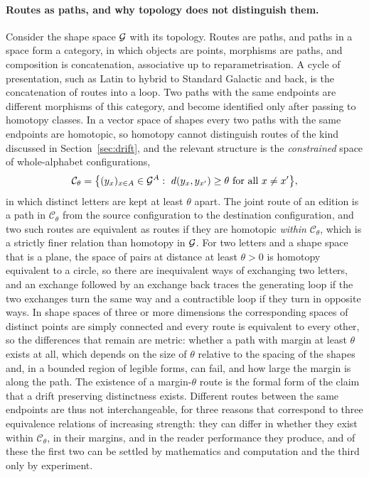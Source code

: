 \paragraph{Routes as paths, and why topology does not distinguish them.}
Consider the shape space $\mathcal{G}$ with its topology. Routes are paths, and paths in a space form a category, in which objects are points, morphisms are paths, and composition is concatenation, associative up to reparametrisation. A cycle of presentation, such as Latin to hybrid to Standard Galactic and back, is the concatenation of routes into a loop. Two paths with the same endpoints are different morphisms of this category, and become identified only after passing to homotopy classes. In a vector space of shapes every two paths with the same endpoints are homotopic, so homotopy cannot distinguish routes of the kind discussed in Section~\ref{sec:drift}, and the relevant structure is the \emph{constrained} space of whole-alphabet configurations,
\[
\mathcal{C}_\theta=\bigl\{(y_x)_{x\in A}\in\mathcal{G}^{A}:\ d(y_x,y_{x'})\ge\theta\ \text{for all }x\ne x'\bigr\},
\]
in which distinct letters are kept at least $\theta$ apart. The joint route of an edition is a path in $\mathcal{C}_\theta$ from the source configuration to the destination configuration, and two such routes are equivalent as routes if they are homotopic \emph{within} $\mathcal{C}_\theta$, which is a strictly finer relation than homotopy in $\mathcal{G}$. For two letters and a shape space that is a plane, the space of pairs at distance at least $\theta>0$ is homotopy equivalent to a circle, so there are inequivalent ways of exchanging two letters, and an exchange followed by an exchange back traces the generating loop if the two exchanges turn the same way and a contractible loop if they turn in opposite ways. In shape spaces of three or more dimensions the corresponding spaces of distinct points are simply connected and every route is equivalent to every other, so the differences that remain are metric: whether a path with margin at least $\theta$ exists at all, which depends on the size of $\theta$ relative to the spacing of the shapes and, in a bounded region of legible forms, can fail, and how large the margin is along the path. The existence of a margin-$\theta$ route is the formal form of the claim that a drift preserving distinctness exists. Different routes between the same endpoints are thus not interchangeable, for three reasons that correspond to three equivalence relations of increasing strength: they can differ in whether they exist within $\mathcal{C}_\theta$, in their margins, and in the reader performance they produce, and of these the first two can be settled by mathematics and computation and the third only by experiment.

